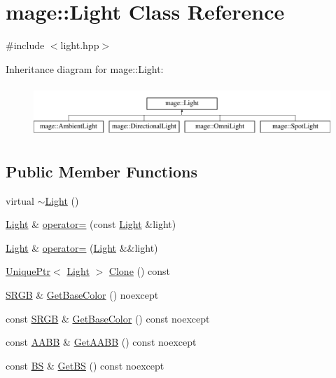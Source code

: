\hypertarget{classmage_1_1_light}{}\section{mage\+:\+:Light Class Reference}
\label{classmage_1_1_light}


{\ttfamily \#include $<$light.\+hpp$>$}

Inheritance diagram for mage\+:\+:Light\+:\begin{figure}[H]
\begin{center}
\leavevmode
\includegraphics[height=1.944445cm]{classmage_1_1_light}
\end{center}
\end{figure}
\subsection*{Public Member Functions}
\begin{DoxyCompactItemize}
\item 
virtual \hyperlink{classmage_1_1_light_af877bc473dede83689a4bda8a36d4d36}{$\sim$\+Light} ()
\item 
\hyperlink{classmage_1_1_light}{Light} \& \hyperlink{classmage_1_1_light_ad1267c8d162e2cdead5e3a7d83cef3c1}{operator=} (const \hyperlink{classmage_1_1_light}{Light} \&light)
\item 
\hyperlink{classmage_1_1_light}{Light} \& \hyperlink{classmage_1_1_light_a5fd2edc3fcbcc1dbe7a2620b76cedd25}{operator=} (\hyperlink{classmage_1_1_light}{Light} \&\&light)
\item 
\hyperlink{namespacemage_a3316d7143a973e37adf1110f2e80ca31}{Unique\+Ptr}$<$ \hyperlink{classmage_1_1_light}{Light} $>$ \hyperlink{classmage_1_1_light_a4c87e4a361b20519c49b4a0397625a6a}{Clone} () const
\item 
\hyperlink{structmage_1_1_s_r_g_b}{S\+R\+GB} \& \hyperlink{classmage_1_1_light_ab91bc6fe671417f49c63346d1ed83576}{Get\+Base\+Color} () noexcept
\item 
const \hyperlink{structmage_1_1_s_r_g_b}{S\+R\+GB} \& \hyperlink{classmage_1_1_light_a3dfe7de799e39693b7243379650f281f}{Get\+Base\+Color} () const noexcept
\item 
const \hyperlink{structmage_1_1_a_a_b_b}{A\+A\+BB} \& \hyperlink{classmage_1_1_light_a1ce1d4a97857b182e629e0e546beb280}{Get\+A\+A\+BB} () const noexcept
\item 
const \hyperlink{structmage_1_1_b_s}{BS} \& \hyperlink{classmage_1_1_light_ab2365a76f8f3a2ae2c97263ea556a993}{Get\+BS} () const noexcept
\end{DoxyCompactItemize}
